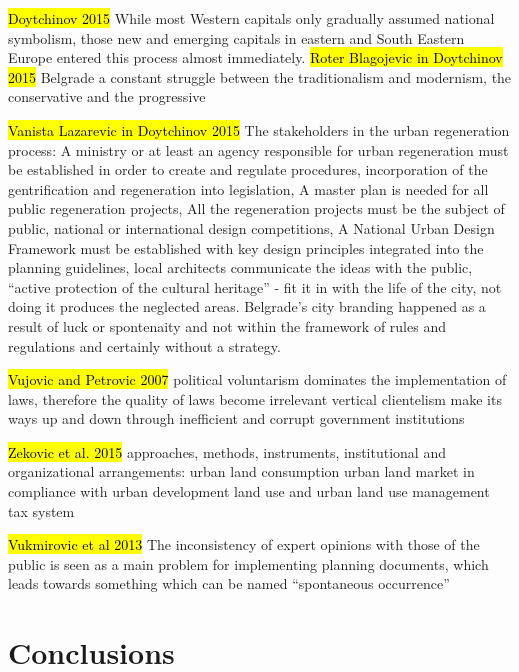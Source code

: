 \documentclass[11pt]{report}
\begin{document}
\hl{Doytchinov 2015}
While most Western capitals only gradually assumed national symbolism, those new and emerging capitals in eastern and South Eastern Europe entered this process almost immediately.
\hl{Roter Blagojevic in Doytchinov 2015}
Belgrade a constant struggle between the traditionalism and modernism, the conservative and the progressive

\hl{Vanista Lazarevic in Doytchinov 2015}
The stakeholders in the urban regeneration process:
A ministry or at least an agency responsible for urban regeneration must be established in order to create and regulate procedures, 
incorporation of the gentrification and regeneration into legislation,
A master plan is needed for all public regeneration projects,
All the regeneration projects must be the subject of public, national or international design competitions,
A National Urban Design Framework must be established with key design principles integrated into the planning guidelines,
local architects communicate the ideas with the public,
“active protection of the cultural heritage” - fit it in with the life of the city, not doing it produces the neglected areas.
Belgrade’s city branding happened as a result of luck or spontenaity and not within the framework of rules and regulations  and  certainly  without  a  strategy.

\hl{Vujovic and Petrovic 2007}
political voluntarism dominates the implementation of laws, therefore the quality of laws become irrelevant
vertical clientelism make its ways up and down through inefficient and corrupt government institutions 

\hl{Zekovic et al. 2015}
approaches, methods, instruments, institutional and organizational arrangements:
    urban land consumption
    urban land market in compliance with urban development
    land use and urban land use management
    tax system 

\hl{Vukmirovic et al 2013}
The inconsistency of expert opinions with those of the public is seen 
as  a  main  problem  for  implementing  planning  documents,  which  leads  towards  something  which  can  be named “spontaneous occurrence”


\chapter{Conclusions}

\end{document}
